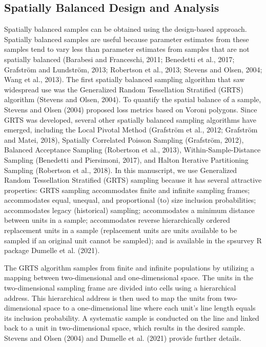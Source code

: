\documentclass[]{elsarticle} %
\begin{document}
\hypertarget{subsec:spb_design}{%
\subsection{Spatially Balanced Design and
Analysis}\label{subsec:spb_design}}

Spatially balanced samples can be obtained using the design-based
approach. Spatially balanced samples are useful because parameter
estimates from these samples tend to vary less than parameter estimates
from samples that are not spatially balanced (Barabesi and Franceschi,
2011; Benedetti et al., 2017; Grafström and Lundström, 2013; Robertson
et al., 2013; Stevens and Olsen, 2004; Wang et al., 2013). The first
spatially balanced sampling algorithm that saw widespread use was the
Generalized Random Tessellation Stratified (GRTS) algorithm (Stevens and
Olsen, 2004). To quantify the spatial balance of a sample, Stevens and
Olsen (2004) proposed loss metrics based on Voroni polygons. Since GRTS
was developed, several other spatially balanced sampling algorithms have
emerged, including the Local Pivotal Method (Grafström et al., 2012;
Grafström and Matei, 2018), Spatially Correlated Poisson Sampling
(Grafström, 2012), Balanced Acceptance Sampling (Robertson et al.,
2013), Within-Sample-Distance Sampling (Benedetti and Piersimoni, 2017),
and Halton Iterative Partitioning Sampling (Robertson et al., 2018). In
this manuscript, we use Generalized Random Tessellation Stratified
(GRTS) sampling because it has several attractive properties: GRTS
sampling accommodates finite and infinite sampling frames; accommodates
equal, unequal, and proportional (to) size inclusion probabilities;
accommodates legacy (historical) sampling; accommodates a minimum
distance between units in a sample; accommodates reverse hierarchically
ordered replacement units in a sample (replacement units are units
available to be sampled if an original unit cannot be sampled); and is
available in the spsurvey R package Dumelle et al. (2021).

The GRTS algorithm samples from finite and infinite populations by
utilizing a mapping between two-dimensional and one-dimensional space.
The units in the two-dimensional sampling frame are divided into cells
using a hierarchical address. This hierarchical address is then used to
map the units from two-dimensional space to a one-dimensional line where
each unit's line length equals its inclusion probability. A systematic
sample is conducted on the line and linked back to a unit in
two-dimensional space, which results in the desired sample. Stevens and
Olsen (2004) and Dumelle et al. (2021) provide further details.
\end{document}
